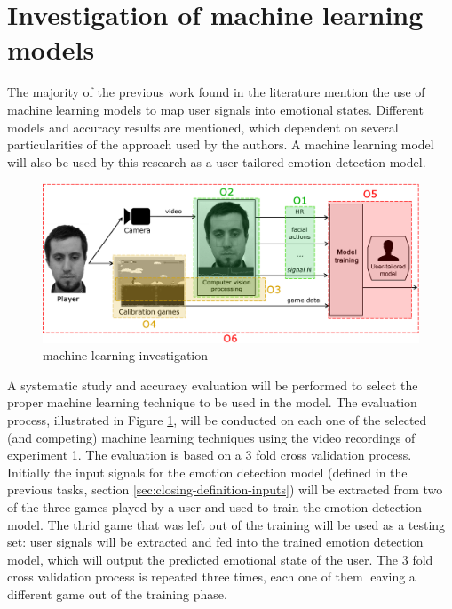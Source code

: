 \section{Investigation of machine learning models}
\label{closing:investigation-machine-learning}

The majority of the previous work found in the literature mention the use of machine learning models to map user signals into emotional states. Different models and accuracy results are mentioned, which dependent on several particularities of the approach used by the authors. A machine learning model will also be used by this research as a user-tailored emotion detection model.

\begin{figure}[h]
    \centering
    \includegraphics[width=\textwidth]{figures/components-objectives.png}
    \caption{machine-learning-investigation}
    \label{fig:machine-learning-investigation}
\end{figure}

A systematic study and accuracy evaluation will be performed to select the proper machine learning technique to be used in the model. The evaluation process, illustrated in Figure \ref{fig:machine-learning-investigation}, will be conducted on each one of the selected (and competing) machine learning techniques using the video recordings of experiment 1. The evaluation is based on a 3 fold cross validation process. Initially the input signals for the emotion detection model (defined in the previous tasks, section \ref{sec:closing-definition-inputs}) will be extracted from two of the three games played by a user and used to train the emotion detection model. The thrid game that was left out of the training will be used as a testing set: user signals will be extracted and fed into the trained emotion detection model, which will output the predicted emotional state of the user. The 3 fold cross validation process is repeated three times, each one of them leaving a different game out of the training phase.

